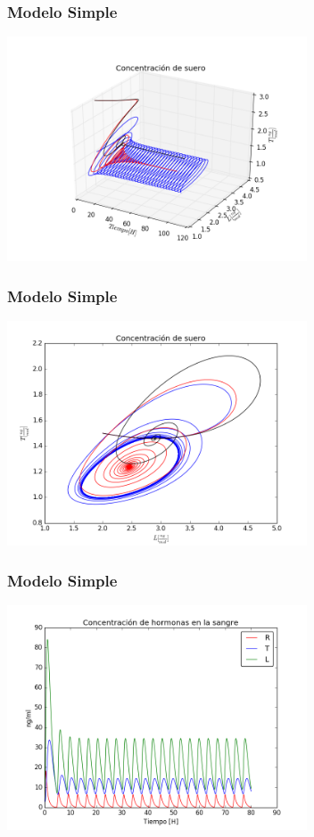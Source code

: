 \documentclass[10pt]{beamer}
\begin{document}
\begin{frame}
\frametitle{Modelo Simple}
\begin{center}
 \includegraphics[width=3.5in]{imagenes/Graficas/Modelos_Simples/g3_3D.png}
\end{center}
\end{frame}


\begin{frame}
\frametitle{Modelo Simple}
\begin{center}
 \includegraphics[width=3.5in]{imagenes/Graficas/Modelos_Simples/g4_2D.png}
\end{center}
\end{frame}

\begin{frame}
\frametitle{Modelo Simple}
\begin{center}
 \includegraphics[width=3.5in]{imagenes/Graficas/Modelos_Simples/g5_g2-modelo2.png}
\end{center}
\end{frame}
\end{document}
